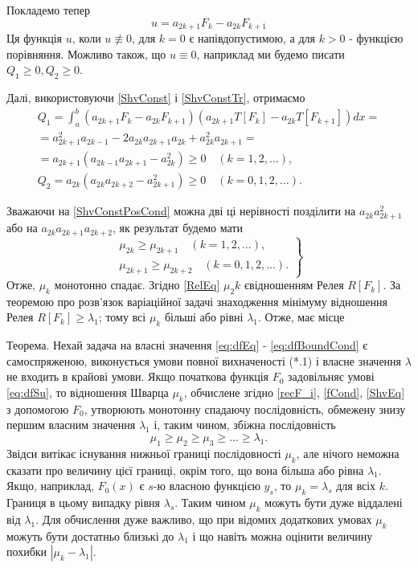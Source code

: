 \documentclass[12pt,a4paper]{article}
\begin{document}
Покладемо тепер
\[
	u = a_{2k+1} F_k - a_{2k} F_{k+1}
\]
Ця функція $u$, коли $u \not\equiv 0$, для $k=0$ є напівдопустимою, а для $k>0$ - функцією порівняння. Можливо також, що $u \equiv 0$, наприклад ми будемо писати $Q_1 \geq 0, Q_2 \geq 0$.

Далі, використовуючи \eqref{ShvConst} і \eqref{ShvConstTr}, отримаємо
\[
\begin{array}{l}
	Q_1 = \int_a^b (a_{2k+1} F_k - a_{2k} F_{k+1})(a_{2k+1} T[F_k] - a_{2k} T[F_{k+1}])dx = \\
= a_{2k+1}^2 a_{2k-1} - 2 a_{2k} a_{2k+1} a_{2k} + a_{2k}^2 a_{2k+1} = \\
= a_{2k+1}(a_{2k-1} a_{2k+1} - a_{2k}^2) \geq 0 \quad (k=1,2,\dots), \\
Q_2 = a_{2k}(a_{2k} a_{2k+2} - a_{2k+1}^2) \geq 0 \quad (k=0,1,2,\dots).
\end{array}
\]

Зважаючи на \eqref{ShvConstPosCond} можна дві ці нерівності позділити на $a_{2k} a_{2k+1}^2$ або на $a_{2k} a_{2k+1} a_{2k+2}$, як результат будемо мати
\begin{equation}\label{eq:ShvMuDecr}
\left. \begin{array}{l}
		\mu_{2k} \geq \mu_{2k+1} \quad (k=1,2,\dots), \\
		\mu_{2k+1} \geq \mu_{2k+2} \quad (k=0,1,2,\dots).
\end{array} \right\}
\end{equation}
Отже, $\mu_k$ монотонно спадає. Згідно \eqref{RelEq} $\mu_2k$ євідношенням Релея $R[F_k]$. За теоремою про розв’язок варіаційної задачі знаходження мінімуму відношення Релея $R[F_k] \geq \lambda_1$; тому всі $\mu_k$ більші або рівні $\lambda_1$.
Отже, має місце

Теорема. Нехай задача на власні значення \eqref{eq:dfEq} - \eqref{eq:dfBoundCond} є самоспряженою, виконується умови повної вихначеності (*.1) і власне значення $\lambda$ не входить в крайові умови. Якщо початкова функція $F_0$ задовільняє умові \eqref{eq:dfSu}, то відношення Шварца $\mu_k$, обчислене згідно \eqref{recF_i}, \eqref{fCond}, \eqref{ShvEq} з допомогою $F_0$, утворюють монотонну спадаючу послідовність, обмежену знизу першим власним значення $\lambda_1$ і, таким чином, збіжна послідовність 
\begin{equation}\label{eq:ShvLim}
	\mu_1 \geq \mu_2 \geq \mu_3 \geq \dots \geq \lambda_1 .
\end{equation}
Звідси витікає існування нижньої границі послідовності $\mu_k$, але нічого неможна сказати про величину цієї границі, окрім того, що вона більша або рівна $\lambda_1$. Якщо, наприклад, $F_0(x)$ є $s$-ю власною функцією $y_s$, то $\mu_k = \lambda_s$ для всіх $k$. Границя в цьому випадку рівня $\lambda_s$. Таким чином $\mu_k$ можуть бути дуже віддалені від $\lambda_1$. Для обчислення дуже важливо, що при відомих додаткових умовах $\mu_k$ можуть бути достатньо близькі до $\lambda_1$ і що навіть можна оцінити величину похибки $|\mu_k - \lambda_1|$.
\end{document}
